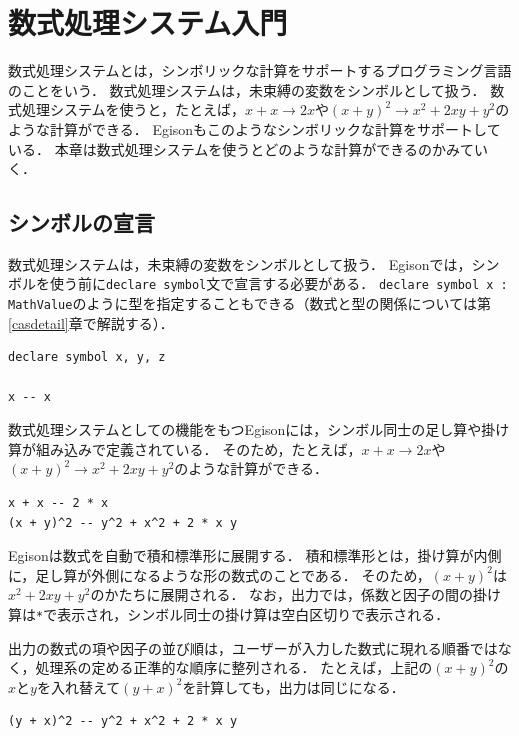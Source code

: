 \chapter{数式処理システム入門}\label{cas}

数式処理システムとは，シンボリックな計算をサポートするプログラミング言語のことをいう．
数式処理システムは，未束縛の変数をシンボルとして扱う．
数式処理システムを使うと，たとえば，$x + x \rightarrow 2x$や$(x + y)^2 \rightarrow x^2 + 2 x y + y^2$のような計算ができる．
Egisonもこのようなシンボリックな計算をサポートしている．
本章は数式処理システムを使うとどのような計算ができるのかみていく．

\section{シンボルの宣言}\label{cas-symbol}

数式処理システムは，未束縛の変数をシンボルとして扱う．
Egisonでは，シンボルを使う前に\lstinline{declare symbol}文で宣言する必要がある．
\lstinline{declare symbol x : MathValue}のように型を指定することもできる（数式と型の関係については第\ref{casdetail}章で解説する）．
\begin{lstlisting}[language=egison,numbers=none]
declare symbol x, y, z

x -- x
\end{lstlisting}

数式処理システムとしての機能をもつEgisonには，シンボル同士の足し算や掛け算が組み込みで定義されている．
そのため，たとえば，$x + x \rightarrow 2x$や$(x + y)^2 \rightarrow x^2 + 2 x y + y^2$のような計算ができる．
\begin{lstlisting}[language=egison,numbers=none]
x + x -- 2 * x
(x + y)^2 -- y^2 + x^2 + 2 * x y
\end{lstlisting}

Egisonは数式を自動で積和標準形に展開する．
積和標準形とは，掛け算が内側に，足し算が外側になるような形の数式のことである．
そのため，$(x + y)^2$は$x^2 + 2 x y + y^2$のかたちに展開される．
なお，出力では，係数と因子の間の掛け算は\lstinline{*}で表示され，シンボル同士の掛け算は空白区切りで表示される．

出力の数式の項や因子の並び順は，ユーザーが入力した数式に現れる順番ではなく，処理系の定める正準的な順序に整列される．
たとえば，上記の$(x + y)^2$の$x$と$y$を入れ替えて$(y + x)^2$を計算しても，出力は同じになる．
\begin{lstlisting}[language=egison,numbers=none]
(y + x)^2 -- y^2 + x^2 + 2 * x y
\end{lstlisting}

